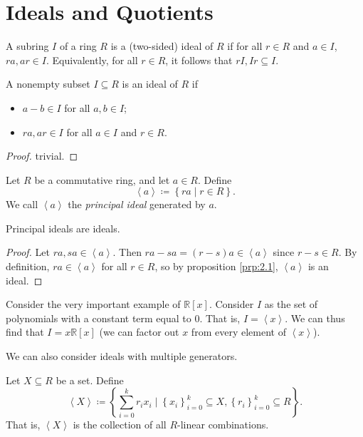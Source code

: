 \chapter{Ideals and Quotients}
\begin{definition}[Ideal]\label{dfn:2.1}
	A subring $I$ of a ring $R$ is a (two-sided) ideal of $R$ if for all $r\in R$ and $a\in I$, $ra,ar\in I$. Equivalently, for all $r\in R$, it follows that $rI,Ir\subseteq I$.
\end{definition}

\begin{proposition}\label{prp:2.1}
	A nonempty subset $I\subseteq R$ is an ideal of $R$ if
	\begin{itemize}
		\item $a-b\in I$ for all $a,b\in I$;
		\item $ra,ar\in I$ for all $a\in I$ and $r\in R$.
	\end{itemize}
\end{proposition}
\begin{proof}
	trivial.
\end{proof}
\begin{definition}\label{dfn:2.2}
	Let $R$ be a commutative ring, and let $a\in R$. Define
	\[
		\left\langle a \right\rangle \coloneqq \left\{ ra\mid r\in R \right\} 
	.\]
	We call $\left\langle a \right\rangle $ the \emph{principal ideal} generated by $a$.
\end{definition}
\begin{proposition}\label{prp:2.2}
	Principal ideals are ideals.
\end{proposition}
\begin{proof}
	Let $ra,sa\in \left\langle a \right\rangle $. Then $ra-sa=(r-s)a\in \left\langle a \right\rangle $ since $r-s\in R$. By definition, $ra\in \left\langle a \right\rangle $ for all $r\in R$, so by proposition \ref{prp:2.1}, $\left\langle a \right\rangle $ is an ideal.
\end{proof}

Consider the very important example of $\mathbb{R} [x]$. Consider $I$ as the set of polynomials with a constant term equal to 0. That is, $I=\left\langle x \right\rangle $. We can thus find that $I=x\mathbb{R} [x]$ (we can factor out $x$ from every element of $\left\langle x \right\rangle $).

We can also consider ideals with multiple generators.

\begin{definition}\label{dfn:2.3}
	Let $X\subseteq R$ be a set. Define
	\[
		\left\langle X \right\rangle \coloneqq \left\{ \sum_{i=0}^{k} r_ix_i\mid \left\{ x_i \right\}_{i=0}^k \subseteq X,\left\{ r_i \right\}_{i=0}^k \subseteq R\right\} 
	.\]
	That is, $\left\langle X \right\rangle $ is the collection of all $R$-linear combinations.
\end{definition}

